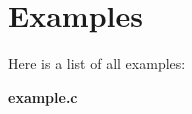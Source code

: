 \section{Examples}
Here is a list of all examples:\begin{DoxyCompactItemize}
\item 
{\bf example.c}
\end{DoxyCompactItemize}
